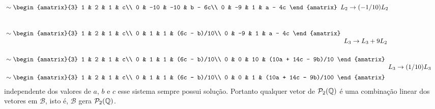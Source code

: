 \begin{exemplos}
\begin{enumerate}
\begin{solucao}
\begin{align}
\begin{array}{l}
          \end{array}\\\nonumber&\sim
          \begin{amatrix}{3}
            1 & 2 & 1 & c\\
            0 & -10 & -10 & b - 6c\\
            0 & -9 & 1 & a - 4c
          \end{amatrix}
          \begin{array}{l}
            \phantom{x}\\L_2 \to (-1/10)L_2\\\phantom{x}
          \end{array}\\\nonumber&\sim
          \begin{amatrix}{3}
            1 & 2 & 1 & c\\
            0 & 1 & 1 & (6c - b)/10\\
            0 & -9 & 1 & a - 4c
          \end{amatrix}
          \begin{array}{l}
            \phantom{x}\\\phantom{x}\\L_3 \to L_3 + 9L_2
          \end{array}\\\nonumber&\sim
          \begin{amatrix}{3}
            1 & 2 & 1 & c\\
            0 & 1 & 1 & (6c - b)/10\\
            0 & 0 & 10 & (10a + 14c - 9b)/10
          \end{amatrix}
          \begin{array}{l}
            \phantom{x}\\\phantom{x}\\L_3 \to (1/10)L_3
          \end{array}\\&\sim
          \begin{amatrix}{3}
            1 & 2 & 1 & c\\
            0 & 1 & 1 & (6c - b)/10\\
            0 & 0 & 1 & (10a + 14c - 9b)/100
          \end{amatrix}
        \end{align}
        independente dos valores de $a$, $b$ e $c$ esse sistema sempre possui solução. Portanto qualquer vetor de $\mathcal{P}_2(\mathbb{Q})$ é uma combinação linear dos vetores em $\mathcal{B}$, isto é, $\mathcal{B}$ gera $\mathcal{P}_2(\mathbb{Q})$.


\end{solucao}
\end{enumerate}
\end{exemplos}
